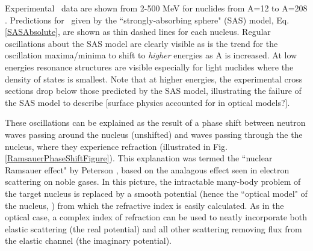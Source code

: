 \begin{eqation}
Experimental \tot\ data are shown from 2-500
MeV for nuclides from A=12 to A=208
\cite{Finlay1993, Schwartz1974, Poenitz1983, Abfalterer2000, Abfalterer2001}.
Predictions for \tot\ given by the ``strongly-absorbing sphere" (SAS)
model, Eq. \ref{SASAbsolute}, are shown as thin dashed lines for each nucleus.
Regular oscillations about the SAS model are clearly visible
as is the trend for the oscillation
maxima/minima to shift to \textit{higher} energies as A is increased. At low energies 
resonance structures are visible especially for light nuclides where the
density of states is smallest. Note that at higher energies, the experimental
cross sections drop below those predicted by the SAS model, illustrating
the failure of the SAS model to describe [surface physics accounted for in
optical models?].

These oscillations can be explained as the result of a phase shift between 
neutron waves passing around the nucleus (unshifted) and waves passing
through the the nucleus, where they experience refraction
(illustrated in Fig. \ref{RamsauerPhaseShiftFigure}). This explanation was termed the ``nuclear 
Ramsauer effect" by Peterson \cite{Peterson1962}, based on the analagous effect seen in 
electron scattering on noble gases.
In this picture, the intractable many-body
problem of the target nucleus is replaced by a smooth potential (hence the
``optical model" of the nucleus, \cite{Feshbach1958}) from which the refractive
index is easily calculated. As in the optical case, a complex index of
refraction can be used to neatly incorporate both elastic scattering (the real
potential) and all other scattering removing flux from the elastic channel (the imaginary potential).


\end{eqation}
